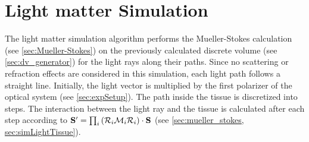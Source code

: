 \section{Light matter Simulation}
\label{sec:simulation}
%
The light matter simulation algorithm performs the Mueller-Stokes calculation (see \cref{sec:Mueller-Stokes}) on the previously calculated discrete volume (see \cref{sec:dv_generator}) for the light rays along their paths.
Since no scattering or refraction effects are considered in this simulation, each light path follows a straight line.
Initially, the light vector is multiplied by the first polarizer of the optical system (see \cref{sec:expSetup}).
The path inside the tissue is discretized into steps.
The interaction between the light ray and the tissue is calculated after each step according to $ \mathbf{S}' = \prod_i \left(\mathcal{R}_i \mathcal{M}_i \mathcal{R}_i\right) \cdot \mathbf{S}$ (see \cref{sec:mueller_stokes, sec:simLightTissue}).
% 
%
%
